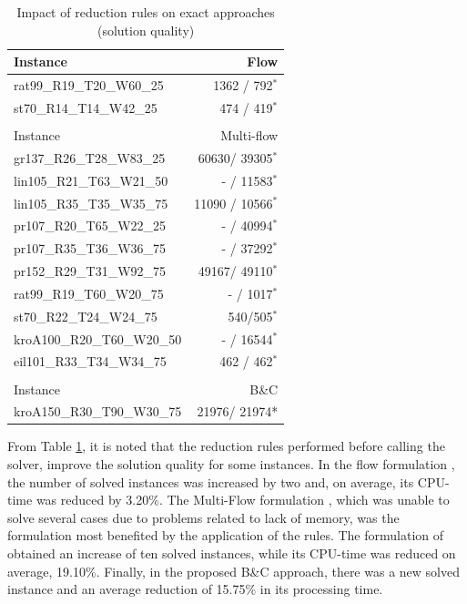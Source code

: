 \documentclass{singlecol-new}
\theoremstyle{TH}{
\newtheorem{lemma}{Lemma}
\newtheorem{theorem}[lemma]{Theorem}
\newtheorem{corrolary}[lemma]{Corrolary}
\newtheorem{conjecture}[lemma]{Conjecture}
\newtheorem{proposition}[lemma]{Proposition}
\newtheorem{claim}[lemma]{Claim}
\newtheorem{stheorem}[lemma]{Wrong Theorem}
}
\theoremstyle{THrm}{
\newtheorem{definition}{Definition}[section]
\newtheorem{question}{Question}[section]
\newtheorem{remark}{Remark}
\newtheorem{scheme}{Scheme}
}
\theoremstyle{THhit}{
\newtheorem{case}{Case}[section]
}
\begin{document}
\begin{table}[!h]
	\centering
	\caption{Impact of reduction rules on exact approaches (solution quality)}
	\label{tab:rr-exact}
	{\footnotesize
	\begin{tabular}{lr}
		\hline
		Instance                   & Flow \citep{lyra2004problema}                            \\
		\hline
		rat99\_R19\_T20\_W60\_25   & 1362 / 792$^*$   \\
		st70\_R14\_T14\_W42\_25    & 474 / 419$^*$     \\
		&                                  \\
		\hline
		Instance                   & Multi-flow \citep{silva2009problema}                       \\
		\hline
		gr137\_R26\_T28\_W83\_25   & 60630/ 39305$^*$  \\
		lin105\_R21\_T63\_W21\_50  & - / 11583$^*$                       \\
		lin105\_R35\_T35\_W35\_75  & 11090 / 10566$^*$ \\
		pr107\_R20\_T65\_W22\_25   & - / 40994$^*$                       \\
		pr107\_R35\_T36\_W36\_75   & - / 37292$^*$                       \\
		pr152\_R29\_T31\_W92\_75   & 49167/ 49110$^*$                    \\
		rat99\_R19\_T60\_W20\_75   & - / 1017$^*$      \\
		st70\_R22\_T24\_W24\_75    & 540/505$^*$       \\
		kroA100\_R20\_T60\_W20\_50 & - / 16544$^*$     \\
		eil101\_R33\_T34\_W34\_75  & 462 / 462$^*$     \\
		&                                  \\
		\hline
		Instance                   & B\&C                             \\
		\hline
		kroA150\_R30\_T90\_W30\_75 & 21976/ 21974* 
	\end{tabular}
}
\end{table}

From Table \ref{tab:rr-exact}, it is noted that the reduction rules performed before calling the solver, improve the solution quality for some instances. In the flow formulation \citep{lyra2004problema}, the number of solved instances was increased by two and, on average, its CPU-time was reduced by 3.20\%. The Multi-Flow formulation \citep{silva2009problema}, which was unable to solve several cases due to problems related to lack of memory, was the formulation most benefited by the application of the rules. The formulation of \citet{silva2009problema} obtained an increase of ten solved instances, while its CPU-time was reduced on average, 19.10\%. Finally, in the proposed B\&C approach, there was a new solved instance and an average reduction of 15.75\% in its processing time.
\end{document}
